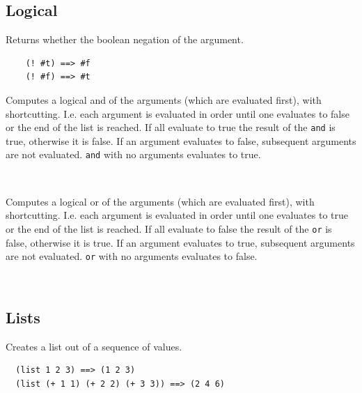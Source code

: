 \documentclass[12pt]{article}
\begin{document}
\subsection{Logical}


Returns whether the boolean negation of the argument.

\begin{verbatim}
    (! #t) ==> #f
    (! #f) ==> #t
\end{verbatim}


Computes a logical and of the arguments (which are evaluated first),
with shortcutting. I.e. each argument is evaluated in order until one
evaluates to false or the end of the list is reached. If all evaluate
to true the result of the \verb|and| is true, otherwise it is false.
If an argument evaluates to false, subsequent arguments are not
evaluated. \verb|and| with no arguments evaluates to true.

\begin{verbatim}
  
\end{verbatim}


Computes a logical or of the arguments (which are evaluated first),
with shortcutting. I.e. each argument is evaluated in order until one
evaluates to true or the end of the list is reached. If all evaluate
to false the result of the \verb|or| is false, otherwise it is true.
If an argument evaluates to true, subsequent arguments are not
evaluated. \verb|or| with no arguments evaluates to false.

\begin{verbatim}
  
\end{verbatim}

\subsection{Lists}


Creates a list out of a sequence of values.

\begin{verbatim}
  (list 1 2 3) ==> (1 2 3)
  (list (+ 1 1) (+ 2 2) (+ 3 3)) ==> (2 4 6)
\end{verbatim}
\end{document}
